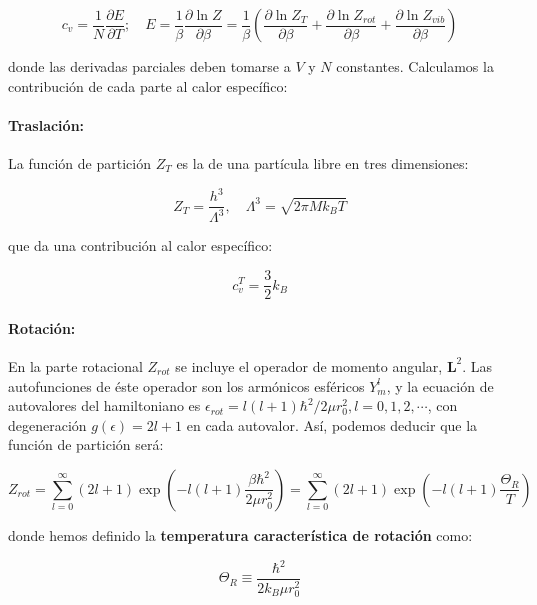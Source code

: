 \documentclass[11pt, a4paper]{article} %
\theoremstyle{named}
\begin{document}
\begin{equation}\label{eq:diatCtot}
    c_{v}=\frac{1}{N} \frac{\partial E}{\partial T} ; \quad E=\frac{1}{\beta} \frac{\partial \ln Z}{\partial \beta}=\frac{1}{\beta}\left(\frac{\partial \ln Z_{T}}{\partial \beta}+\frac{\partial \ln Z_{r o t}}{\partial \beta}+\frac{\partial \ln Z_{vib}}{\partial \beta}\right)
\end{equation}

donde las derivadas parciales deben tomarse a $V$ y $N$ constantes. Calculamos la contribución de cada parte al calor específico:

\paragraph{Traslación:} La función de partición $Z_T$ es la de una partícula libre en tres dimensiones:

\begin{equation}
    Z_{T}=\frac{h^{3}}{\Lambda^{3}}, \quad \Lambda^{3}=\sqrt{2 \pi M k_{B} T}
\end{equation}

que da una contribución al calor específico:

\begin{equation}
    c_v^T = \frac{3}{2} k_B
\end{equation}

\paragraph{Rotación:} En la parte rotacional $Z_{rot}$ se incluye el operador de momento angular, $\mathbf{L}^2$. Las autofunciones de éste operador son los armónicos esféricos $Y_m^l$, y la ecuación de autovalores del hamiltoniano es $\epsilon_{rot} = l(l+1) \hbar^2 / 2 \mu r_0^2, l = 0,1,2, \cdots$, con degeneración $g(\epsilon) = 2l+1$ en cada autovalor. Así, podemos deducir que la función de partición será:

\begin{equation}\label{eq:diatZrot}
    Z_{r o t}=\sum_{l=0}^{\infty}(2 l+1) \exp \left(-l(l+1) \frac{\beta \hbar^{2}}{2 \mu r_{0}^{2}}\right)=\sum_{l=0}^{\infty}(2 l+1) \exp \left(-l(l+1) \frac{\Theta_R}{T}\right)
\end{equation}

donde hemos definido la \textbf{temperatura característica de rotación} como:

\begin{equation}\label{eq:diatTrot}
    \Theta_R \equiv \frac{\hbar^2}{2k_B\mu r_0^2}
\end{equation}
\end{document}
